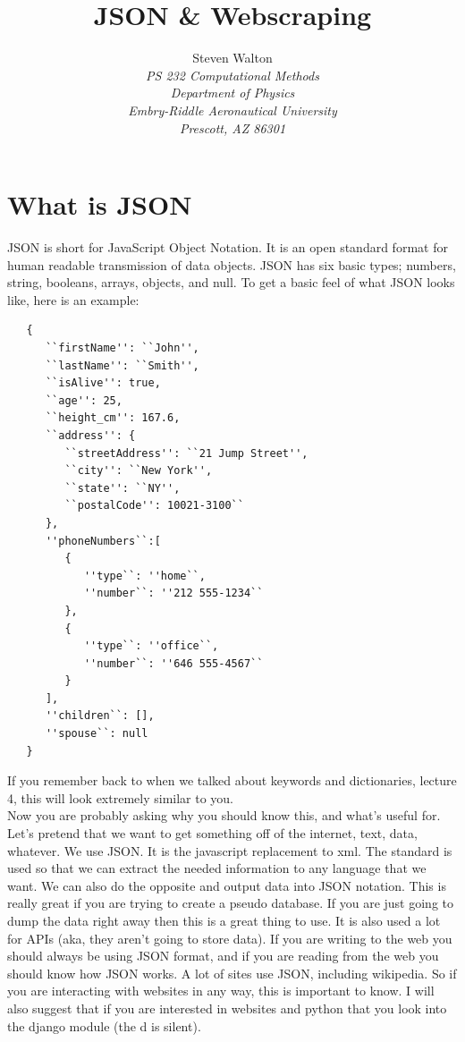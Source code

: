 \documentclass[11pt]{article}   %
\title{JSON & Webscraping}
\author{Steven Walton\\     %
\textit{PS 232 Computational Methods}\\
\textit{Department of Physics}\\
\textit{Embry-Riddle Aeronautical University}\\
\textit{Prescott, AZ   86301}}
\begin{document}
\maketitle
\section*{What is JSON}
JSON is short for JavaScript Object Notation.  It is an open standard format for human readable transmission of data objects.  JSON has six basic types; numbers, string, booleans, arrays, objects, and null.  To get a basic feel of 
what JSON looks like, here is an example:
\begin{tcolorbox}
   \begin{lstlisting}
   {
      ``firstName'': ``John'',
      ``lastName'': ``Smith'',
      ``isAlive'': true,
      ``age'': 25,
      ``height_cm'': 167.6,
      ``address'': {
         ``streetAddress'': ``21 Jump Street'',
         ``city'': ``New York'',
         ``state'': ``NY'',
         ``postalCode'': 10021-3100``
      },
      ''phoneNumbers``:[
         {
            ''type``: ''home``,
            ''number``: ''212 555-1234``
         },
         {
            ''type``: ''office``,
            ''number``: ''646 555-4567``
         }
      ],
      ''children``: [],
      ''spouse``: null
   }
   \end{lstlisting}
\end{tcolorbox}
If you remember back to when we talked about keywords and dictionaries, lecture 4, this will look extremely similar to you.
\\
Now you are probably asking why you should know this, and what's useful for.  Let's pretend that we want to get something off of the internet, text, data, whatever.  We use JSON. It is the javascript replacement to xml.  The standard is used so that we can extract the needed
information to any language that we want.  We can also do the opposite and output data into JSON notation.  This is really great if you are trying to create a pseudo database.  If you are just going to dump the data right away
then this is a great thing to use.  It is also used a lot for APIs (aka, they aren't going to store data).
If you are writing to the web you should always be using JSON format, and if you are reading from the web you should know how JSON works.  A lot of sites use JSON, including wikipedia.  So if you are interacting with websites in 
any way, this is important to know. I will also suggest that if you are interested in websites and python that you look into the django module (the d is silent).
\end{document}
